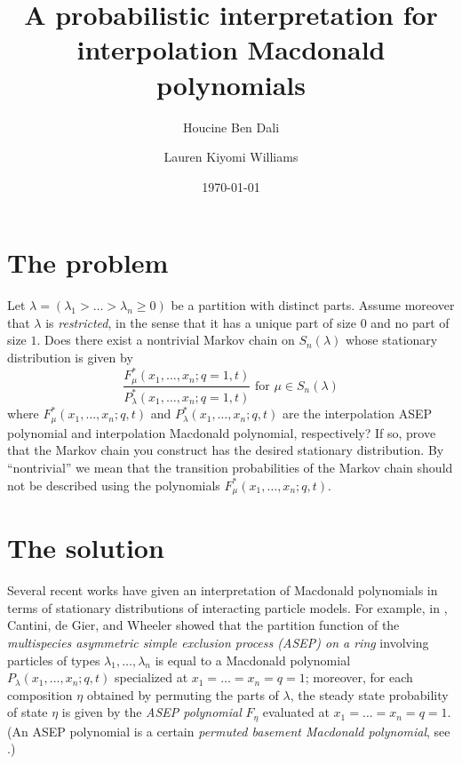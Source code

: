\documentclass[12pt]{amsart}
\author[]{}
\title[A probabilistic interpretation for interpolation Macdonald polynomials]{A probabilistic interpretation for\\ interpolation Macdonald polynomials}%
\date{\today}
\author{Houcine Ben Dali}
\author{Lauren Kiyomi Williams}
\theoremstyle{definition}
\begin{document}
\maketitle

\section{The problem}

Let $\lambda=(\lambda_1 > \dots > \lambda_n \geq 0)$ be a partition with distinct parts.  Assume moreover that 
$\lambda$ is \emph{restricted}, in the sense that it has a unique part of size $0$ and no part of size $1$.
Does there exist a nontrivial Markov chain on $S_n(\lambda)$  whose stationary distribution is given by
$$\frac{F^*_{\mu}(x_1,\dots,x_n; q=1,t)}{P^*_{\lambda}(x_1,\dots,x_n;
q=1,t)} \text{ for }\mu\in S_n(\lambda)$$
where $F^*_{\mu}(x_1,\dots,x_n; q,t)$ and
$P^*_{\lambda}(x_1,\dots,x_n;q,t)$ are the
interpolation ASEP polynomial and interpolation Macdonald polynomial,
respectively?  If so, prove that the Markov chain you construct has the
desired stationary distribution.  By ``nontrivial'' we mean that the
transition probabilities of the Markov chain should not be described
using the polynomials $F_{\mu}^*(x_1,\dots,x_n; q,t)$.


\newpage 
 

\section{The solution}
\iffalse
Several recent works have given an interpretation of Macdonald polynomials in terms of stationary distributions of interacting particle models.
For example, in \cite{CantinideGierWheeler2015}, Cantini, de Gier, and Wheeler showed that the partition function of the \emph{multispecies asymmetric simple exclusion process (ASEP) on a ring} involving particles of types $\lambda_1,\dots,\lambda_n$ is equal to a Macdonald polynomial 
$P_{\lambda}(x_1,\dots,x_n;q,t)$ specialized at 
$x_1=\dots=x_n=q=1$; moreover, for each composition $\eta$ obtained by permuting the parts of $\lambda$, the  steady state probability of state $\eta$ is given by  the \emph{ASEP polynomial} $F_{\eta}$ evaluated at 
$x_1=\dots=x_n=q=1$.  (An ASEP polynomial is a certain \emph{permuted basement Macdonald polynomial}, see \cite[Proposition 4.1]{CorteelMandelshtamWilliams2022}.)
\end{document}
